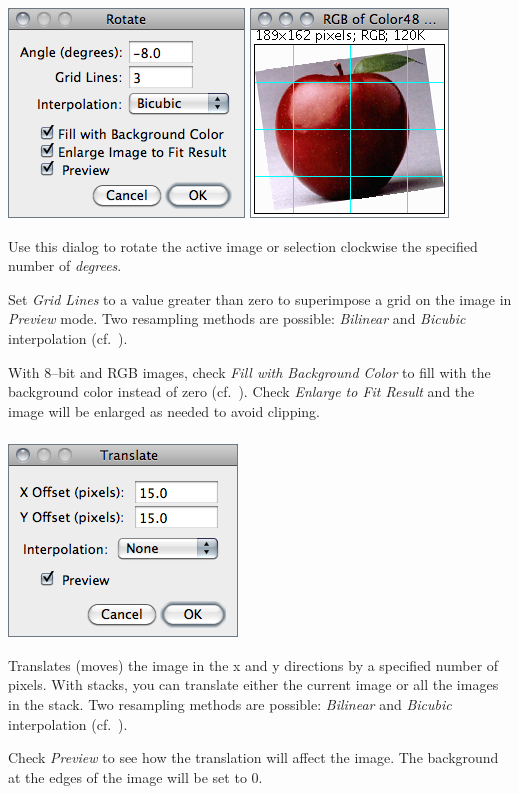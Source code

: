 \begin{minipage}[c][1\totalheight][t]{0.595\columnwidth}%
\includegraphics[scale=0.55]{images/Rotate}%
\end{minipage}%
\begin{minipage}[c][1\totalheight][t]{0.405\columnwidth}%
Use this dialog to rotate the active image or selection clockwise
the specified number of \emph{degrees}. \medskip{}


Set \emph{Grid Lines} to a value greater than zero to superimpose
a grid on the image in \emph{Preview} mode. Two resampling methods
are possible: \emph{Bilinear} and \emph{Bicubic} interpolation (cf.\ ).%
\end{minipage}

With 8--bit and RGB images, check \emph{Fill with Background Color}
to fill with the background color instead of zero (cf.\ ).
Check\emph{ Enlarge to Fit Result} and the image will be enlarged
as needed to avoid clipping.


\subsubsection{\protect{}}

\begin{minipage}[c][1\totalheight][t]{0.337\columnwidth}%
\includegraphics[scale=0.55]{images/Translate}%
\end{minipage}%
\begin{minipage}[c][1\totalheight][t]{0.663\columnwidth}%
Translates (moves) the image in the x and y directions by a specified
number of pixels. With stacks, you can translate either the current
image or all the images in the stack. Two resampling methods are possible:
\emph{Bilinear} and \emph{Bicubic} interpolation (cf.\ ).
\medskip{}


Check \emph{Preview} to see how the translation will affect the image.
The background at the edges of the image will be set to 0.%
\end{minipage}


